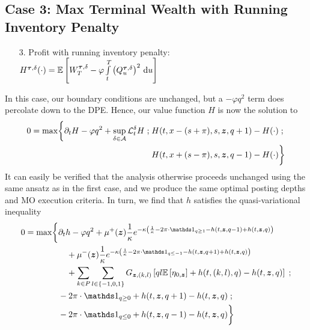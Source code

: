 \subsection{Case 3: Max Terminal Wealth with Running Inventory Penalty}
\begin{enumerate}[noitemsep, topsep=0pt]
\item[3.] Profit with running inventory penalty: $H^{\bm{\tau}, \delta}(\cdot) = \mathbb{E} \left[  W_T^{\bm{\tau}, \delta}  - \varphi \int\limits_t^T \left( Q^{\bm{\tau}, \delta}_u \right)^2 \,\mathrm{d}u  \right]$
\end{enumerate}
In this case, our boundary conditions are unchanged, but a $-\varphi q^2$ term does percolate down to the DPE. Hence, our value function $H$ is now the solution to
\begin{equation}
\label{eq:DPEcase3}
\begin{split}
0 = \max \biggl\lbrace \partial_t H - \varphi q^2 + \sup \limits_{\delta \in \mathcal{A}} \mathcal{L}^{\delta}_t H \; ; \; & H(t,x-(s+\pi), s, \bm{z}, q+1) - H(\cdot) \; ; \\
&  H(t,x+(s-\pi), s, \bm{z}, q-1) - H(\cdot) \biggr\rbrace
\end{split}
\end{equation}
It can easily be verified that the analysis otherwise proceeds unchanged using the same ansatz as in the first case, and we produce the same optimal posting depths and MO execution criteria. In turn, we find that $h$ satisfies the quasi-variational inequality
\begin{equation}\label{eq:PDEcase3}
\begin{split}
0 = \max \biggl\lbrace & \partial_t h -\varphi q^2 + \mu^+(\bz) \frac{1}{\kappa} e^{ -\kappa \left( \frac{1}{\kappa} - 2 \pi \cdot \indicator_{q \geq 1} - h(t,\bz,q-1) + h(t,\bz,q)  \right)} \\
& \quad + \mu^-(\bz) \frac{1}{\kappa} e^{ -\kappa \left( \frac{1}{\kappa} - 2 \pi \cdot \indicator_{q \leq -1} - h(t,\bz,q+1) + h(t,\bz,q) \right)} \\
& \quad + \sum_{k\in P} \sum_{l \in \{-1,0,1\}} G_{\bz,(k,l)} \left[ ql \E \left[ \eta_{0,\bz} \right] + h(t,(k,l),q) - h(t,\bz,q) \right] \; ; \\
& -2 \pi \cdot \indicator_{q \geq 0} + h(t, \bz, q+1) - h(t,\bz,q)   \; ; \\
& -2 \pi \cdot \indicator_{q \leq 0} + h(t, \bz, q-1) - h(t,\bz,q)  \biggr\rbrace
\end{split}
\end{equation}